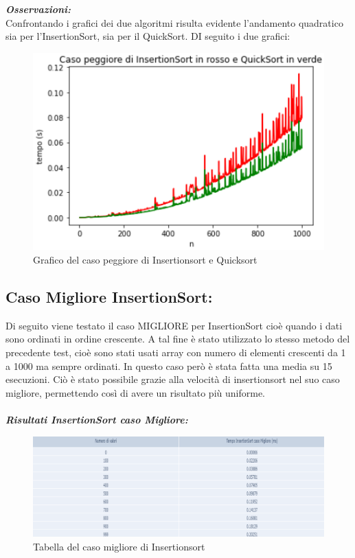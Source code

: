 \documentclass{article}
\begin{document}
\noindent \textit{\bf{Osservazioni:}}
\newline
\\
Confrontando i grafici dei due algoritmi risulta evidente l'andamento quadratico sia per l'InsertionSort, sia per il QuickSort. DI seguito i due grafici: \\

\begin{figure}[H]
\centering
\includegraphics[width=.7\textwidth, height=.6\textheight, keepaspectratio]{CasoPeggioreGrafico}
\vspace{-5mm}
\caption{Grafico del caso peggiore di Insertionsort e Quicksort}
\label{fig:fig4}
\end{figure}



\subsection {Caso Migliore InsertionSort:}
Di seguito viene testato il caso MIGLIORE per InsertionSort cioè quando i dati sono ordinati in ordine crescente. A tal fine è stato utilizzato lo stesso metodo del precedente test, cioè sono stati usati array con numero di elementi crescenti da 1 a 1000 ma sempre ordinati. In questo caso però è stata fatta una media su 15 esecuzioni. Ciò è stato possibile grazie alla velocità di insertionsort nel suo caso migliore, permettendo così di avere un risultato più uniforme. \\
\\
\textit{\bf{Risultati InsertionSort caso Migliore:}} \\
\begin{figure}[h]
\centering
\includegraphics[width=\textwidth]{CasoMiglioreTabella}
\vspace{-5mm}
\caption{Tabella del caso migliore di Insertionsort}
\label{fig:fig5}
\end{figure} \\
\\
\end{document}
